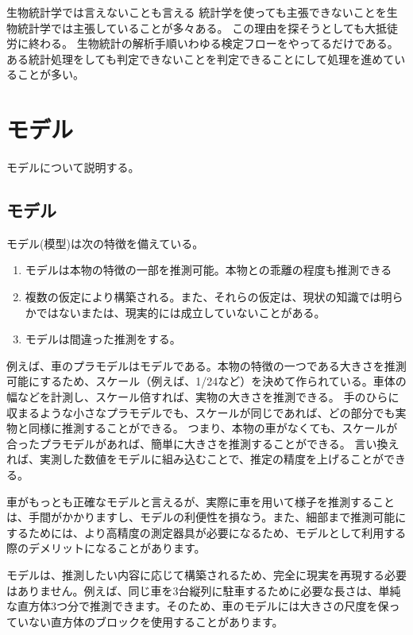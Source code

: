 \begin{SMbox}{生物統計学では言えないことも言える}
統計学を使っても主張できないことを生物統計学では主張していることが多々ある。
この理由を探そうとしても大抵徒労に終わる。
生物統計の解析手順いわゆる検定フローをやってるだけである。
ある統計処理をしても判定できないことを判定できることにして処理を進めていることが多い。
\end{SMbox}

\chapter{モデル}
モデルについて説明する。

\section{モデル}
モデル(模型)は次の特徴を備えている。
\begin{enumerate}
 \item モデルは本物の特徴の一部を推測可能。本物との乖離の程度も推測できる
 \item 複数の仮定により構築される。また、それらの仮定は、現状の知識では明らかではないまたは、現実的には成立していないことがある。
 \item モデルは間違った推測をする。
\end{enumerate}
  
例えば、車のプラモデルはモデルである。本物の特徴の一つである大きさを推測可能にするため、スケール（例えば、1/24など）を決めて作られている。車体の幅などを計測し、スケール倍すれば、実物の大きさを推測できる。
手のひらに収まるような小さなプラモデルでも、スケールが同じであれば、どの部分でも実物と同様に推測することができる。
つまり、本物の車がなくても、スケールが合ったプラモデルがあれば、簡単に大きさを推測することができる。
言い換えれば、実測した数値をモデルに組み込むことで、推定の精度を上げることができる。

車がもっとも正確なモデルと言えるが、実際に車を用いて様子を推測することは、手間がかかりますし、モデルの利便性を損なう。また、細部まで推測可能にするためには、より高精度の測定器具が必要になるため、モデルとして利用する際のデメリットになることがあります。

モデルは、推測したい内容に応じて構築されるため、完全に現実を再現する必要はありません。例えば、同じ車を3台縦列に駐車するために必要な長さは、単純な直方体3つ分で推測できます。そのため、車のモデルには大きさの尺度を保っていない直方体のブロックを使用することがあります。

